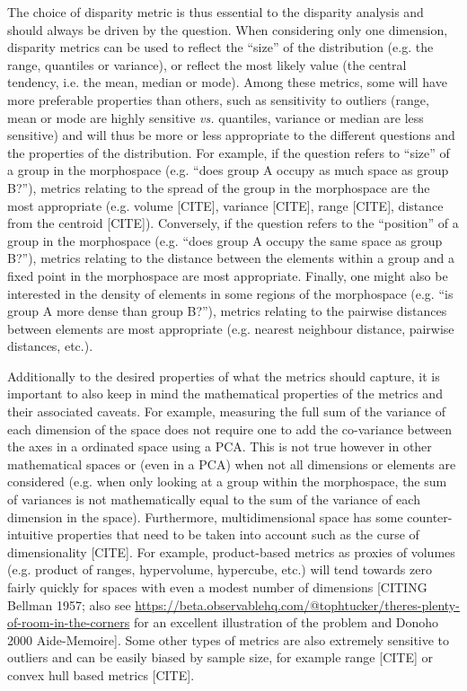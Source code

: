 \documentclass[12pt,letterpaper]{article}
\begin{document}
The choice of disparity metric is thus essential to the disparity analysis and should always be driven by the question.
When considering only one dimension, disparity metrics can be used to reflect the ``size'' of the distribution (e.g. the range, quantiles or variance), or reflect the most likely value (the central tendency, i.e. the mean, median or mode).
Among these metrics, some will have more preferable properties than others, such as sensitivity to outliers (range, mean or mode are highly sensitive \textit{vs.} quantiles, variance or median are less sensitive) and will thus be more or less appropriate to the different questions and the properties of the distribution.
For example, if the question refers to ``size'' of a group in the morphospace (e.g. ``does group A occupy as much space as group B?''), metrics relating to the spread of the group in the morphospace are the most appropriate (e.g. volume [CITE], variance [CITE], range [CITE], distance from the centroid [CITE]).
Conversely, if the question refers to the ``position'' of a group in the morphospace (e.g. ``does group A occupy the same space as group B?''), metrics relating to the distance between the elements within a group and a fixed point in the morphospace are most appropriate.
Finally, one might also be interested in the density of elements in some regions of the morphospace (e.g. ``is group A more dense than group B?''), metrics relating to the pairwise distances between elements are most appropriate (e.g. nearest neighbour distance, pairwise distances, etc.).

Additionally to the desired properties of what the metrics should capture, it is important to also keep in mind the mathematical properties of the metrics and their associated caveats.
For example, measuring the full sum of the variance of each dimension of the space does not require one to add the co-variance between the axes in a ordinated space using a PCA.
This is not true however in other mathematical spaces or (even in a PCA) when not all dimensions or elements are considered (e.g. when only looking at a group within the morphospace, the sum of variances is not mathematically equal to the sum of the variance of each dimension in the space).
Furthermore, multidimensional space has some counter-intuitive properties that need to be taken into account such as the curse of dimensionality [CITE].
For example, product-based metrics as proxies of volumes (e.g. product of ranges, hypervolume, hypercube, etc.) will tend towards zero fairly quickly for spaces with even a modest number of dimensions [CITING Bellman 1957; also see \url{https://beta.observablehq.com/@tophtucker/theres-plenty-of-room-in-the-corners} for an excellent illustration of the problem and Donoho 2000 Aide-Memoire].
Some other types of metrics are also extremely sensitive to outliers and can be easily biased by sample size, for example range [CITE] or convex hull based metrics [CITE].
\end{document}
